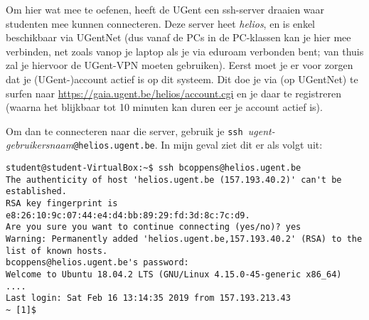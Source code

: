 \documentclass[a4paper,twoside,openany]{memoir}
\begin{document}
Om hier wat mee te oefenen, heeft de UGent een ssh-server draaien waar
studenten mee kunnen connecteren. Deze server heet \emph{helios}, en is enkel
beschikbaar via UGentNet (dus vanaf de PCs in de PC-klassen kan je hier mee
verbinden, net zoals vanop je laptop als je via eduroam verbonden bent; van
thuis zal je hiervoor de UGent-VPN moeten gebruiken). Eerst moet je er voor
zorgen dat je \mbox{(UGent-)account} actief is op dit systeem. Dit doe je via
(op UGentNet) te surfen naar \url{https://gaia.ugent.be/helios/account.cgi} en
je daar te registreren (waarna het blijkbaar tot 10 minuten kan duren eer je
account actief is).

Om dan te connecteren naar die server, gebruik je \verb!ssh !\emph{ugent-gebruikersnaam}\verb!@helios.ugent.be!. In mijn geval ziet dit er als volgt uit:
\begin{verbatim}
student@student-VirtualBox:~$ ssh bcoppens@helios.ugent.be
The authenticity of host 'helios.ugent.be (157.193.40.2)' can't be established.
RSA key fingerprint is e8:26:10:9c:07:44:e4:d4:bb:89:29:fd:3d:8c:7c:d9.
Are you sure you want to continue connecting (yes/no)? yes
Warning: Permanently added 'helios.ugent.be,157.193.40.2' (RSA) to the list of known hosts.
bcoppens@helios.ugent.be's password:
Welcome to Ubuntu 18.04.2 LTS (GNU/Linux 4.15.0-45-generic x86_64)
....
Last login: Sat Feb 16 13:14:35 2019 from 157.193.213.43
~ [1]$
\end{verbatim}
\end{document}
